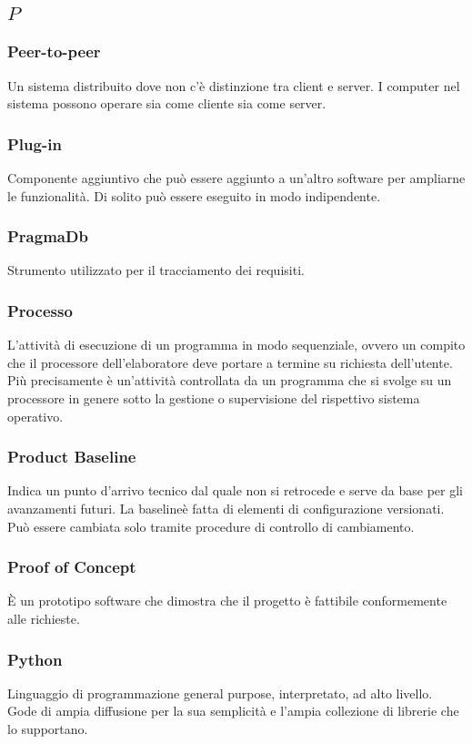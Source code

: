 \subsection*{\quad$P\quad$}
\subsubsection*{Peer-to-peer}
Un sistema distribuito dove non c'è distinzione tra client e server. I computer nel sistema possono operare sia come cliente sia come server. 

\subsubsection*{Plug-in}
Componente aggiuntivo che può essere aggiunto a un'altro software per ampliarne le funzionalità. Di solito può essere eseguito in modo indipendente.

\subsubsection*{PragmaDb}
Strumento utilizzato per il tracciamento dei requisiti.


\subsubsection*{Processo}
L'attività di esecuzione di un programma in modo sequenziale, ovvero un compito che il processore dell'elaboratore deve portare a termine su richiesta dell'utente. Più precisamente è un'attività controllata da un programma che si svolge su un processore in genere sotto la gestione o supervisione del rispettivo sistema operativo.

\subsubsection*{Product Baseline}
Indica un punto d’arrivo tecnico dal quale non si retrocede e serve da base per gli avanzamenti futuri. La baseline\glosp è fatta di elementi di configurazione versionati. Può essere cambiata solo tramite procedure di controllo di cambiamento.

\subsubsection*{Proof of Concept}
È un prototipo software che dimostra che il progetto è fattibile conformemente alle richieste.

\subsubsection*{Python}
Linguaggio di programmazione general purpose, interpretato, ad alto livello. Gode di ampia diffusione per la sua semplicità e l'ampia collezione di librerie che lo supportano.

